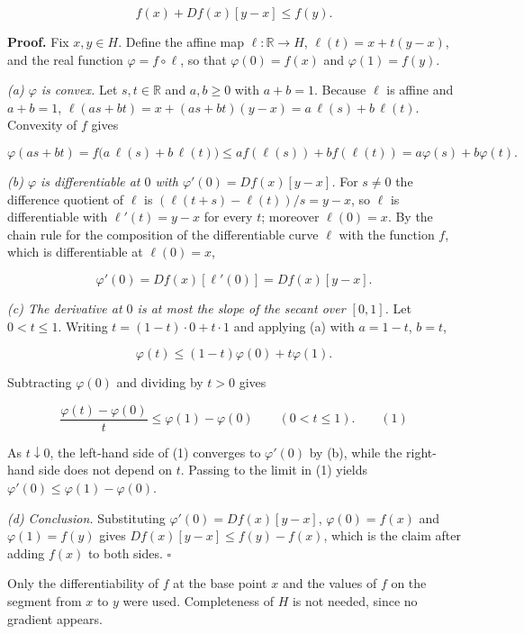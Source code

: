 \documentclass[11pt,a4paper]{article}
\begin{document}
\[f(x)+Df(x)[y-x]\le f(y).\]


\textbf{Proof.} Fix \(x,y\in H\). Define the affine map \(\ell:\mathbb R\to H\), \(\ell(t)=x+t(y-x)\), and the real function \(\varphi=f\circ\ell\), so that \(\varphi(0)=f(x)\) and \(\varphi(1)=f(y)\).




\emph{(a) \(\varphi\) is convex.} Let \(s,t\in\mathbb R\) and \(a,b\ge0\) with \(a+b=1\). Because \(\ell\) is affine and \(a+b=1\), \(\ell(as+bt)=x+(as+bt)(y-x)=a\,\ell(s)+b\,\ell(t)\). Convexity of \(f\) gives


\[\varphi(as+bt)=f\bigl(a\,\ell(s)+b\,\ell(t)\bigr)\le af(\ell(s))+bf(\ell(t))=a\varphi(s)+b\varphi(t).\]


\emph{(b) \(\varphi\) is differentiable at \(0\) with \(\varphi'(0)=Df(x)[y-x]\).} For \(s\ne0\) the difference quotient of \(\ell\) is \((\ell(t+s)-\ell(t))/s=y-x\), so \(\ell\) is differentiable with \(\ell'(t)=y-x\) for every \(t\); moreover \(\ell(0)=x\). By the chain rule for the composition of the differentiable curve \(\ell\) with the function \(f\), which is differentiable at \(\ell(0)=x\),


\[\varphi'(0)=Df(x)[\ell'(0)]=Df(x)[y-x].\]


\emph{(c) The derivative at \(0\) is at most the slope of the secant over \([0,1]\).} Let \(0<t\le1\). Writing \(t=(1-t)\cdot0+t\cdot1\) and applying (a) with \(a=1-t\), \(b=t\),


\[\varphi(t)\le(1-t)\varphi(0)+t\varphi(1).\]


Subtracting \(\varphi(0)\) and dividing by \(t>0\) gives


\[\frac{\varphi(t)-\varphi(0)}{t}\le\varphi(1)-\varphi(0)\qquad(0<t\le1).\qquad(1)\]


As \(t\downarrow0\), the left-hand side of (1) converges to \(\varphi'(0)\) by (b), while the right-hand side does not depend on \(t\). Passing to the limit in (1) yields \(\varphi'(0)\le\varphi(1)-\varphi(0)\).




\emph{(d) Conclusion.} Substituting \(\varphi'(0)=Df(x)[y-x]\), \(\varphi(0)=f(x)\) and \(\varphi(1)=f(y)\) gives \(Df(x)[y-x]\le f(y)-f(x)\), which is the claim after adding \(f(x)\) to both sides. \(\square\)




Only the differentiability of \(f\) at the base point \(x\) and the values of \(f\) on the segment from \(x\) to \(y\) were used. Completeness of \(H\) is not needed, since no gradient appears.
\end{document}
